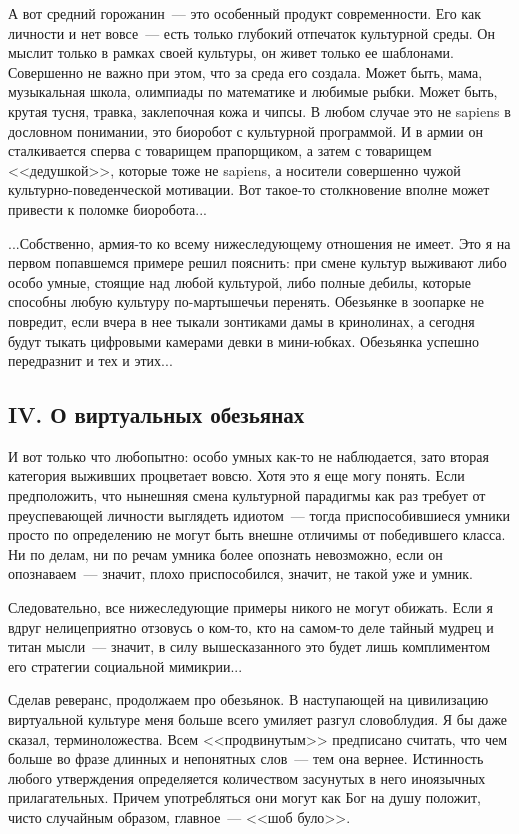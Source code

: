 \documentclass{scrbook}
\newcommand{\flqq}{<<}
\newcommand{\frqq}{>>}
\newcommand{\mdash}{~--- }
\newcommand{\essaysection}[1]{\subsection*{#1}\nopagebreak}
\begin{document}
А вот средний горожанин{\mdash}это особенный продукт современности. Его как личности и нет вовсе{\mdash}есть только глубокий отпечаток культурной среды. Он мыслит только в рамках своей культуры, он живет только ее шаблонами. Совершенно не важно при этом, что за среда его создала. Может быть, мама, музыкальная школа, олимпиады по математике и любимые рыбки. Может быть, крутая тусня, травка, заклепочная кожа и чипсы. В любом случае это не sapiens в дословном понимании, это биоробот с культурной программой. И в армии он сталкивается сперва с товарищем прапорщиком, а затем с товарищем {\flqq}дедушкой{\frqq}, которые тоже не sapiens, а носители совершенно чужой культурно-поведенческой мотивации. Вот такое-то столкновение вполне может привести к поломке биоробота...

...Собственно, армия-то ко всему нижеследующему отношения не имеет. Это я на первом попавшемся примере решил пояснить: при смене культур выживают либо особо умные, стоящие над любой культурой, либо полные дебилы, которые способны любую культуру по-мартышечьи перенять. Обезьянке в зоопарке не повредит, если вчера в нее тыкали зонтиками дамы в кринолинах, а сегодня будут тыкать цифровыми камерами девки в мини-юбках. Обезьянка успешно передразнит и тех и этих...

\essaysection{IV. О виртуальных обезьянах}

И вот только что любопытно: особо умных как-то не наблюдается, зато вторая категория выживших процветает вовсю. Хотя это я еще могу понять. Если предположить, что нынешняя смена культурной парадигмы как раз требует от преуспевающей личности выглядеть идиотом{\mdash}тогда приспособившиеся умники просто по определению не могут быть внешне отличимы от победившего класса. Ни по делам, ни по речам умника более опознать невозможно, если он опознаваем{\mdash}значит, плохо приспособился, значит, не такой уже и умник.

Следовательно, все нижеследующие примеры никого не могут обижать. Если я вдруг нелицеприятно отзовусь о ком-то, кто на самом-то деле тайный мудрец и титан мысли{\mdash}значит, в силу вышесказанного это будет лишь комплиментом его стратегии социальной мимикрии...

Сделав реверанс, продолжаем про обезьянок. В наступающей на цивилизацию виртуальной культуре меня больше всего умиляет разгул словоблудия. Я бы даже сказал, терминоложества. Всем {\flqq}продвинутым{\frqq} предписано считать, что чем больше во фразе длинных и непонятных слов{\mdash}тем она вернее. Истинность любого утверждения определяется количеством засунутых в него иноязычных прилагательных. Причем употребляться они могут как Бог на душу положит, чисто случайным образом, главное{\mdash}{\flqq}шоб було{\frqq}.
\end{document}
